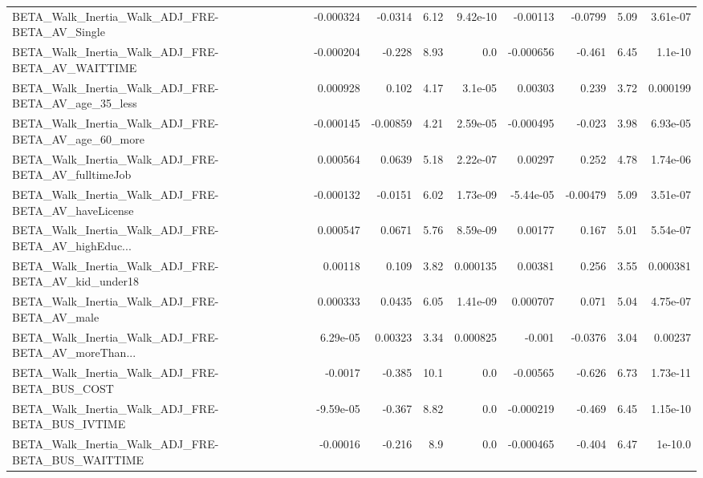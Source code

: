 \begin{tabular}{lrrrrrrrr}
BETA\_Walk\_Inertia\_Walk\_ADJ\_FRE-BETA\_AV\_Single      &   -0.000324 &      -0.0314 &     6.12 & 9.42e-10 &   -0.00113 &     -0.0799 &         5.09 &      3.61e-07 \\
BETA\_Walk\_Inertia\_Walk\_ADJ\_FRE-BETA\_AV\_WAITTIME    &   -0.000204 &       -0.228 &     8.93 &      0.0 &  -0.000656 &      -0.461 &         6.45 &       1.1e-10 \\
BETA\_Walk\_Inertia\_Walk\_ADJ\_FRE-BETA\_AV\_age\_35\_less &    0.000928 &        0.102 &     4.17 &  3.1e-05 &    0.00303 &       0.239 &         3.72 &      0.000199 \\
BETA\_Walk\_Inertia\_Walk\_ADJ\_FRE-BETA\_AV\_age\_60\_more &   -0.000145 &     -0.00859 &     4.21 & 2.59e-05 &  -0.000495 &      -0.023 &         3.98 &      6.93e-05 \\
BETA\_Walk\_Inertia\_Walk\_ADJ\_FRE-BETA\_AV\_fulltimeJob &    0.000564 &       0.0639 &     5.18 & 2.22e-07 &    0.00297 &       0.252 &         4.78 &      1.74e-06 \\
BETA\_Walk\_Inertia\_Walk\_ADJ\_FRE-BETA\_AV\_haveLicense &   -0.000132 &      -0.0151 &     6.02 & 1.73e-09 &  -5.44e-05 &    -0.00479 &         5.09 &      3.51e-07 \\
BETA\_Walk\_Inertia\_Walk\_ADJ\_FRE-BETA\_AV\_highEduc... &    0.000547 &       0.0671 &     5.76 & 8.59e-09 &    0.00177 &       0.167 &         5.01 &      5.54e-07 \\
BETA\_Walk\_Inertia\_Walk\_ADJ\_FRE-BETA\_AV\_kid\_under18 &     0.00118 &        0.109 &     3.82 & 0.000135 &    0.00381 &       0.256 &         3.55 &      0.000381 \\
BETA\_Walk\_Inertia\_Walk\_ADJ\_FRE-BETA\_AV\_male        &    0.000333 &       0.0435 &     6.05 & 1.41e-09 &   0.000707 &       0.071 &         5.04 &      4.75e-07 \\
BETA\_Walk\_Inertia\_Walk\_ADJ\_FRE-BETA\_AV\_moreThan... &    6.29e-05 &      0.00323 &     3.34 & 0.000825 &     -0.001 &     -0.0376 &         3.04 &       0.00237 \\
BETA\_Walk\_Inertia\_Walk\_ADJ\_FRE-BETA\_BUS\_COST       &     -0.0017 &       -0.385 &     10.1 &      0.0 &   -0.00565 &      -0.626 &         6.73 &      1.73e-11 \\
BETA\_Walk\_Inertia\_Walk\_ADJ\_FRE-BETA\_BUS\_IVTIME     &   -9.59e-05 &       -0.367 &     8.82 &      0.0 &  -0.000219 &      -0.469 &         6.45 &      1.15e-10 \\
BETA\_Walk\_Inertia\_Walk\_ADJ\_FRE-BETA\_BUS\_WAITTIME   &    -0.00016 &       -0.216 &      8.9 &      0.0 &  -0.000465 &      -0.404 &         6.47 &       1e-10.0 \\

\end{tabular}
